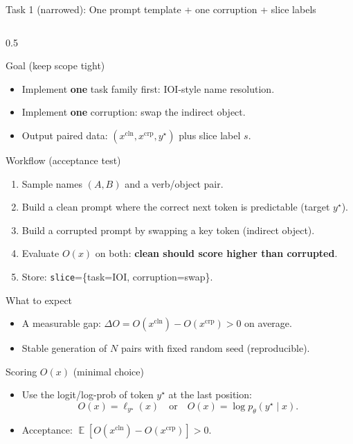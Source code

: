 \documentclass[aspectratio=169,xcolor={dvipsnames}]{beamer}
\renewcommand{\accent}[1]{\textbf{#1}}
\DeclareMathOperator{\Exp}{\mathbb{E}}
\begin{document}
\begin{frame}[fragile,shrink=45]{Task 1 (narrowed): One prompt template + one corruption + slice labels}
\small
\begin{columns}[T,onlytextwidth]
\begin{column}{0.5\textwidth}
\begin{block}{Goal (keep scope tight)}
\begin{itemize}\setlength\itemsep{3pt}
\item Implement \accent{one} task family first: IOI-style name resolution.
\item Implement \accent{one} corruption: swap the indirect object.
\item Output paired data: $(x^{\mathrm{cln}},x^{\mathrm{crp}},y^\star)$ plus slice label $s$.
\end{itemize}
\end{block}

\begin{block}{Workflow (acceptance test)}
\begin{enumerate}\setlength\itemsep{2pt}
\item Sample names $(A,B)$ and a verb/object pair.
\item Build a clean prompt where the correct next token is predictable (target $y^\star$).
\item Build a corrupted prompt by swapping a key token (indirect object).
\item Evaluate $O(x)$ on both: \accent{clean should score higher than corrupted}.
\item Store: \texttt{slice}=\{task=IOI, corruption=swap\}.
\end{enumerate}
\end{block}

\begin{block}{What to expect}
\begin{itemize}\setlength\itemsep{2pt}
\item A measurable gap: $\Delta O = O(x^{\mathrm{cln}})-O(x^{\mathrm{crp}}) > 0$ on average.
\item Stable generation of $N$ pairs with fixed random seed (reproducible).
\end{itemize}
\end{block}

\begin{block}{Scoring $O(x)$ (minimal choice)}
\footnotesize
\begin{itemize}\setlength\itemsep{2pt}
\item Use the logit/log-prob of token $y^\star$ at the last position:
\[
O(x)=\ell_{y^\star}(x)\quad\text{or}\quad O(x)=\log p_\theta(y^\star\mid x).
\]
\item Acceptance: $\Exp[O(x^{\mathrm{cln}})-O(x^{\mathrm{crp}})]>0$.
\end{itemize}
\end{block}


\end{column}
\end{columns}
\end{frame}
\end{document}
